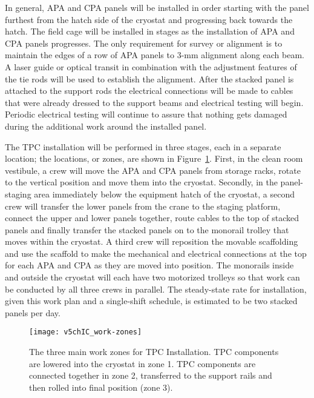In general, APA and CPA panels will be installed in order starting with the panel furthest from the hatch side of the cryostat and progressing back towards the hatch. The field cage will be installed in stages as the installation of APA and CPA panels progresses. The only requirement for survey or alignment is to maintain the edges of a row of APA panels to 3-mm alignment along each beam. A laser guide or optical transit in combination with the adjustment features of the tie rods will be used to establish the alignment. After the stacked panel is attached to the support rods the electrical connections will be made to cables that were already dressed to the support beams and electrical testing will begin. Periodic electrical testing will continue to assure that nothing gets damaged during the additional work around the installed panel. 

The TPC installation will be performed in three stages, each in a separate location; the locations, or zones, are shown in Figure~\ref{fig:work-zones}. 
First, in the clean room vestibule, a crew will move the APA and CPA panels from storage racks, rotate to the vertical position and move them into the cryostat. 
Secondly, in the panel-staging area immediately below the equipment hatch of the cryostat, a second crew will transfer the lower panels from the crane to the staging  platform, connect the upper and lower panels together, route cables to the top of stacked panels and finally transfer the stacked panels on to the monorail trolley that moves within the cryostat. 
A third crew will reposition the movable scaffolding and use the scaffold to make the mechanical and electrical connections at the top for each APA and CPA as they are moved into position. The  monorails inside and outside the cryostat will each have two motorized trolleys so that work can be conducted by all three crews in parallel. 
The steady-state rate for installation, given this work plan and a single-shift schedule, is estimated to be two stacked panels per day. 

\begin{figure}[htbp]
\centering
\texttt{[image: v5chIC\_work-zones]}
\caption[The three main work zones for TPC Installation]{The three main work zones for TPC Installation. TPC components are lowered into the cryostat in zone 1. TPC components are connected together in zone 2, transferred to the support rails and then rolled into final position (zone 3).}
\label{fig:work-zones}
\end{figure}

